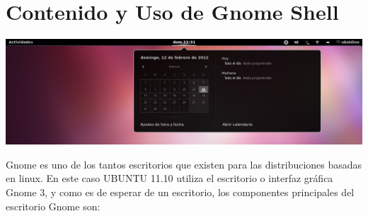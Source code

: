 \chapter{Contenido y Uso de Gnome Shell}
\begin{center}
\includegraphics[scale=0.448]{img/barra.png}
\end{center}
Gnome es uno de los tantos escritorios que existen para las distribuciones basadas en linux.
En este caso UBUNTU 11.10 utiliza el escritorio o interfaz gráfica Gnome 3, y como es de esperar de un escritorio, los componentes principales del escritorio Gnome son:
